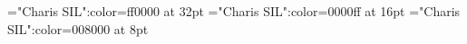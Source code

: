 \documentclass[a4paper]{article}
\begin{document}
\pagestyle{plain}
\sloppy
\setlength{\parfillskip}{0pt plus 1fil}
\font\ta="Charis SIL":color=ff0000 at 32pt
\font\tbta="Charis SIL":color=0000ff at 16pt
\font\tctbta="Charis SIL":color=008000 at 8pt

\pagestyle{fancy} 

\end{document}
